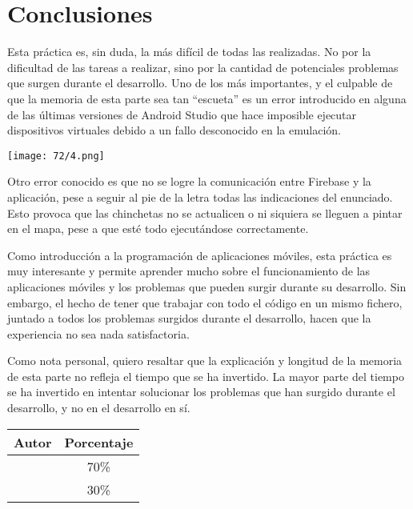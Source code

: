 \section{Conclusiones}
Esta práctica es, sin duda, la más difícil de todas las realizadas. No por la dificultad de las
tareas a realizar, sino por la cantidad de potenciales problemas que surgen durante el desarrollo.
Uno de los más importantes, y el culpable de que la memoria de esta parte sea tan ``escueta'' es
un error introducido en alguna de las últimas versiones de Android Studio que hace imposible
ejecutar dispositivos virtuales debido a un fallo desconocido en la emulación.

\begin{minipage}{\linewidth}
	\centering
	\texttt{[image: 72/4.png]}
	\label{fig:72/4}
\end{minipage}

Otro error conocido es que no se logre la comunicación entre Firebase y la aplicación, pese a seguir
al pie de la letra todas las indicaciones del enunciado. Esto provoca que las chinchetas no se
actualicen o ni siquiera se lleguen a pintar en el mapa, pese a que esté todo ejecutándose correctamente.

Como introducción a la programación de aplicaciones móviles, esta práctica es muy interesante y
permite aprender mucho sobre el funcionamiento de las aplicaciones móviles y los problemas que
pueden surgir durante su desarrollo. Sin embargo, el hecho de tener que trabajar con todo el código en
un mismo fichero, juntado a todos los problemas surgidos durante el desarrollo, hacen que la experiencia no sea
nada satisfactoria.

Como nota personal, quiero resaltar que la explicación y longitud de la memoria de esta parte no refleja
el tiempo que se ha invertido. La mayor parte del tiempo se ha invertido en intentar solucionar los
problemas que han surgido durante el desarrollo, y no en el desarrollo en sí.

\begin{center}
	\begin{tabular}{|c|c|}
		\hline
		\textbf{Autor} & \textbf{Porcentaje} \\
		\hline
		\hline
		\authorOne & 70\% \\
		\authorTwo & 30\% \\
		\hline
	\end{tabular}
\end{center}
